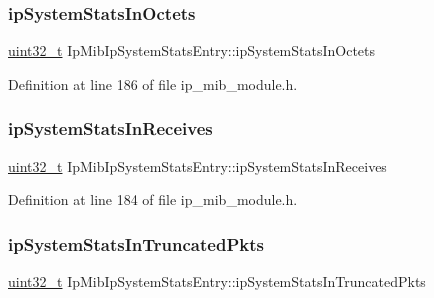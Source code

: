 \subsubsection{\texorpdfstring{ip\+System\+Stats\+In\+Octets}{ipSystemStatsInOctets}}
{\footnotesize\ttfamily \hyperlink{stdint_8h_a435d1572bf3f880d55459d9805097f62}{uint32\+\_\+t} Ip\+Mib\+Ip\+System\+Stats\+Entry\+::ip\+System\+Stats\+In\+Octets}



Definition at line 186 of file ip\+\_\+mib\+\_\+module.\+h.

\mbox{\label{structIpMibIpSystemStatsEntry_a776b8aed16775b4b17913d98d84d6f6e}} 
\subsubsection{\texorpdfstring{ip\+System\+Stats\+In\+Receives}{ipSystemStatsInReceives}}
{\footnotesize\ttfamily \hyperlink{stdint_8h_a435d1572bf3f880d55459d9805097f62}{uint32\+\_\+t} Ip\+Mib\+Ip\+System\+Stats\+Entry\+::ip\+System\+Stats\+In\+Receives}



Definition at line 184 of file ip\+\_\+mib\+\_\+module.\+h.

\mbox{\label{structIpMibIpSystemStatsEntry_a9be59d5eba918daf06b9d3d3c347c810}} 
\subsubsection{\texorpdfstring{ip\+System\+Stats\+In\+Truncated\+Pkts}{ipSystemStatsInTruncatedPkts}}
{\footnotesize\ttfamily \hyperlink{stdint_8h_a435d1572bf3f880d55459d9805097f62}{uint32\+\_\+t} Ip\+Mib\+Ip\+System\+Stats\+Entry\+::ip\+System\+Stats\+In\+Truncated\+Pkts}




